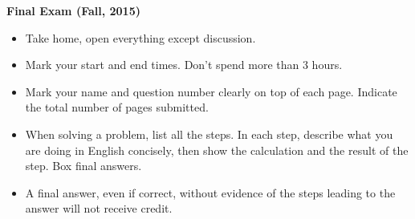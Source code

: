 \usepackage{html}

\begin{center}
{\Large \bf  Final Exam (Fall, 2015)}
\end{center}

\begin{itemize}
\item Take home, open everything except discussion.
\item Mark your start and end times. Don't spend more than 3 hours.
\item Mark your name and question number clearly on top of each page.
  Indicate the total number of pages submitted.
\item When solving a problem, list all the steps. In each step, describe 
  what you are doing in English concisely, then show the calculation and 
  the result of the step. Box final answers.
\item A final answer, even if correct, without evidence of the steps 
  leading to the answer will not receive credit.
\end{itemize}

